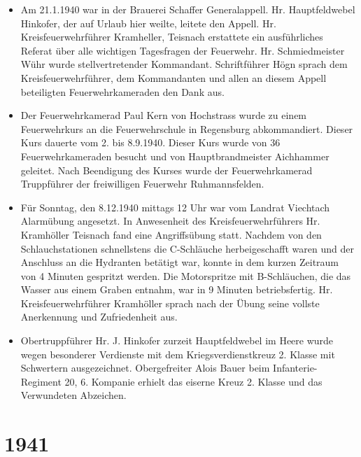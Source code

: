 \documentclass[12pt,a4paper]{book}
\begin{document}
\begin{itemize}
\item Am 21.1.1940 war in der Brauerei Schaffer Generalappell. Hr.
Hauptfeldwebel Hinkofer, der auf Urlaub hier weilte, leitete den Appell.
Hr. Kreisfeuerwehrführer Kramheller, Teisnach erstattete ein
ausführliches Referat über alle wichtigen Tagesfragen der Feuerwehr. Hr.
Schmiedmeister Wühr wurde stellvertretender Kommandant. Schriftführer
Högn sprach dem Kreisfeuerwehrführer, dem Kommandanten und allen an
diesem Appell beteiligten Feuerwehrkameraden den Dank aus.

\item Der Feuerwehrkamerad Paul Kern von Hochstrass wurde zu einem
Feuerwehrkurs an die Feuerwehrschule in Regensburg abkommandiert. Dieser
Kurs dauerte vom 2. bis 8.9.1940. Dieser Kurs wurde von 36
Feuerwehrkameraden besucht und von Hauptbrandmeister Aichhammer
geleitet. Nach Beendigung des Kurses wurde der Feuerwehrkamerad
Truppführer der freiwilligen Feuerwehr Ruhmannsfelden.

\item Für Sonntag, den 8.12.1940 mittags 12 Uhr war vom Landrat
Viechtach Alarmübung angesetzt. In Anwesenheit des Kreisfeuerwehrführers
Hr. Kramhöller Teisnach fand eine Angriffsübung statt. Nachdem von den
Schlauchstationen schnellstens die C-Schläuche herbeigeschafft waren und
der Anschluss an die Hydranten betätigt war, konnte in dem kurzen
Zeitraum von 4 Minuten gespritzt werden. Die Motorspritze mit
B-Schläuchen, die das Wasser aus einem Graben entnahm, war in 9 Minuten
betriebsfertig. Hr. Kreisfeuerwehrführer Kramhöller sprach nach der
Übung seine vollste Anerkennung und Zufriedenheit aus.

\item Obertruppführer Hr. J. Hinkofer zurzeit Hauptfeldwebel im Heere
wurde wegen besonderer Verdienste mit dem Kriegsverdienstkreuz 2. Klasse
mit Schwertern ausgezeichnet. Obergefreiter Alois Bauer beim Infanterie-
Regiment 20, 6. Kompanie erhielt das eiserne Kreuz 2. Klasse und das
Verwundeten Abzeichen.
\end{itemize}

\section*{1941}
\end{document}
